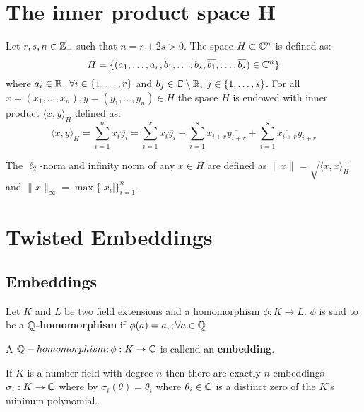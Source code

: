 \documentclass[Ingles]{ic-tese-v3}
\begin{document}
\section{The inner product space H}
\label{sec:orgb07754a}
\begin{definition}
  \label{def:h-space}
  Let $r,s,n \in \mathbb{Z}_+$ such that $n = r + 2s > 0$. The space $H \subset \mathbb{C}^n$ is defined
  as:
  \begin{equation*}
    H = \{(a_1,\dots, a_r, b_1,\dots, b_s, \overline{b_1}, \dots, \overline{b_s}) \in \mathbb{C}^n\}
  \end{equation*}
  where $a_i \in \mathbb{R}, \; \forall i \in \{1,\dots,r\}$ and $b_j \in \mathbb{C} \setminus \mathbb{R}, \; j \in \{1,\dots,
  s\}$. For all $x = \left(x_1, \dots, x_n\right), y = \left(y_1, \dots, y_n\right) \in H$ the space
  $H$ is endowed with inner product $\langle {x,y} \rangle_H$ defined as:
  \begin{equation*}
    \langle {x,y} \rangle_H = \sum_{i=1}^n{x_i \overline{y_i}} = \sum_{i=1}^r{x_i \overline{y_i}} + \sum_{i=1}^s{x_{i+r} \overline{y_{i+r}}} + \sum_{i=1}^s{\overline{x_{i+r}} y_{i+r}}
  \end{equation*}

  The $\ell_2$-norm and infinity norm of any $x \in H$ are defined as $\|x\| =
  \sqrt{\langle{x,x}\rangle_H}$ and $\|x\|_\infty = \max{\{ |x_i| \}}_{i=1}^n $.
\end{definition}

\section{Twisted Embeddings}
\label{sec:org4be4c71}
\subsection{Embeddings}
\label{sec:org15eda12}

\begin{definition}
Let $K$ and $L$ be two field extensions and a homomorphism $\phi: K \rightarrow L$. $\phi$ is said to be a \textbf{$\mathbb{Q}$-homomorphism} if $\phi(a) = a, ; \forall a \in \mathbb{Q}$ 
\end{definition}

\begin{definition}
A $\mathbb{Q}-homomorphism ; \phi: K \rightarrow \mathbb{C}$ is callend an \textbf{embedding}.
\end{definition}

\begin{theorem}
 If $K$ is a number field with degree $n$ then there are
exactly $n$ embeddings $\sigma_i : K \rightarrow \mathbb{C}$ where by $\sigma_i(\theta) =
\theta_i$ where $\theta_i \in \mathbb{C}$ is a distinct zero of the $K$'s
mininum polynomial.
\end{theorem}
\end{document}
